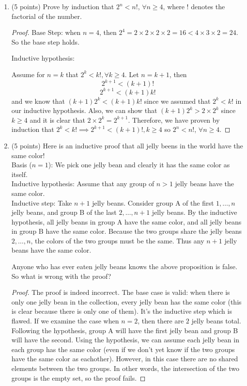 \documentclass[11pt]{article}
\begin{document}
\begin{enumerate}
\begin{proof}
Thus, we have proven that given three numbers, at least one pair of them has 
nonnegative product.

\end{proof}

\item (5 points)  Prove by induction that $2^n < n!$, $\forall n \geq 4$, where ! denotes the factorial of the number.

\begin{proof}

Base Step: when $n=4$, then $2^4 = 2 \times 2 \times 2 \times 2 = 16 < 4 \times 3 \times 2 = 24$.  So the base step holds.  

Inductive hypothesis:

Assume for $n=k$ that $2^k < k!, \forall k \geq 4$.  Let $n = k+1$, then
$$ 2^{k+1} < (k+1)! $$
$$ 2^{k+1} < (k+1)k! $$
and we know that $(k+1)2^k < (k+1)k!$ since we assumed that $2^k < k!$ in our inductive hypothesis.  
Also, we can show that $(k+1)2^k > 2 \times 2^k$ since $k \geq 4$ and it is clear that $2 \times 2^k = 2^{k+1}$.  Therefore, we have proven by induction that $2^k < k! \implies 2^{k+1} < (k+1)!, k \geq 4$ so $2^n < n!$, $\forall n \geq 4$.  

\end{proof}

\newpage
\item (5 points) 
Here is an inductive proof that all jelly beens in the world have the same 
color! \\
Basis ($n=1$): 
We pick one jelly bean and clearly it has the same color as itself.\\
Inductive hypothesis: 
Assume that any group of $n>1$ jelly beans have the same color.\\
Inductive step: Take $n+1$ jelly beans. Consider group A of the first 
$1,\ldots , n$ jelly beans, and group B of the last $2,\ldots ,n+1$ jelly beans.
By the inductive hypothesis, all jelly beans in group A have the same color, 
and all jelly beans in group B have the same color. 
Because the two groups share the jelly beans $2,\ldots , n$, the colors of 
the two groups must be the same. Thus any $n+1$ jelly beans have the same color.

Anyone who has ever eaten jelly beans knows the above proposition is false. 
So what is wrong with the proof?

\begin{proof}

The proof is indeed incorrect.  The base case is valid: when there is only one jelly bean in the collection, every jelly bean has the same color (this is clear because there is only one of them).  It's the inductive step which is flawed.  If we examine the case when $n=2$, then there are $2$ jelly beans total.  Following the hypothesis, group A will have the first jelly bean and group B will have the second.  Using the hypothesis, we can assume each jelly bean in each group has the same color (even if we don't yet know if the two groups have the same color as eachother).  However, in this case there are no shared elements between the two groups.  In other words, the intersection of the two groups is the empty set, so the proof fails.  


\end{proof}
\end{enumerate}
\end{document}
